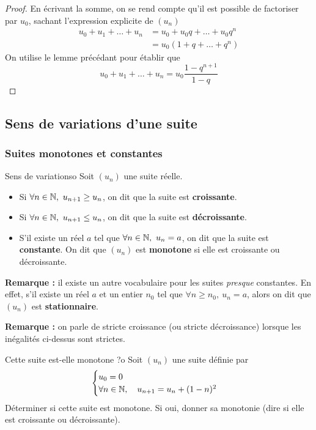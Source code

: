 \begin{proof}
	En écrivant la somme, on se rend compte qu'il est possible de factoriser par $u_0$, sachant l'expression explicite de $(u_n)$ 
	\begin{align*}
		u_0+u_1+\dots+u_n &= u_0+u_0q+\dots+u_0q^n\\
						  &= u_0(1+q+\dots+q^n)
	\end{align*}
	On utilise le lemme précédant pour établir que \[u_0+u_1+\dots+u_n=u_0\frac{1-q^{n+1}}{1-q}\]
\end{proof}

\subsection{Sens de variations d'une suite}
\subsubsection{Suites monotones et constantes}

\begin{definition}{Sens de variations}{o}
	Soit $(u_n)$ une suite réelle. 
	\begin{itemize}
		\item Si $\forall n\in\mathbb{N},\ u_{n+1}\geq u_n$, on dit que la suite est \textbf{croissante}.
		\item Si $\forall n\in\mathbb{N},\ u_{n+1}\leq u_n$, on dit que la suite est \textbf{décroissante}.
		\item S'il existe un réel $a$ tel que $\forall n\in\mathbb{N},\ u_n=a$, on dit que la suite est \textbf{constante}.
		On dit que $(u_n)$ est \textbf{monotone} si elle est croissante ou décroissante.  
	\end{itemize}
\end{definition}
\textbf{Remarque :} il existe un autre vocabulaire pour les suites \textit{presque} constantes. En effet, s'il existe un réel $a$ et un entier $n_0$ tel que $\forall n\geq n_0,\ u_n=a$, alors on dit que $(u_n)$ est \textbf{stationnaire}.


\textbf{Remarque :} on parle de stricte croissance (ou stricte décroissance) lorsque les inégalités ci-dessus sont strictes.
\begin{exemple}{Cette suite est-elle monotone ?}{o}
	Soit $(u_n)$ une suite définie par \[\begin{cases} u_0=0\\\forall n\in\mathbb{N},\quad u_{n+1}=u_n+(1-n)^2\end{cases}\]
	Déterminer si cette suite est monotone. Si oui, donner sa monotonie (dire si elle est croissante ou décroissante).
\end{exemple}

